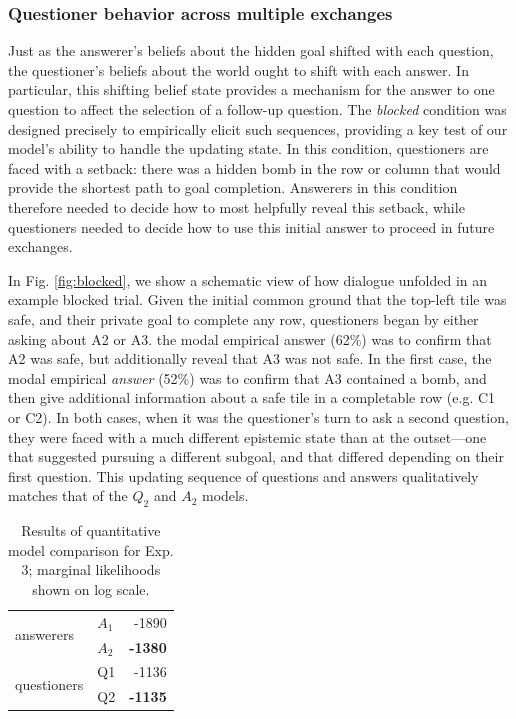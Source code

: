 \documentclass[11pt, floatsintext]{apa6}
\begin{document}
\subsubsection{Questioner behavior across multiple exchanges}

Just as the answerer's beliefs about the hidden goal shifted with each question, the questioner's beliefs about the world ought to shift with each answer. 
In particular, this shifting belief state provides a mechanism for the answer to one question to affect the selection of a follow-up question.
The \emph{blocked} condition was designed precisely to empirically elicit such sequences, providing a key test of our model's ability to handle the updating state.
In this condition, questioners are faced with a setback: there was a hidden bomb in the row or column that would provide the shortest path to goal completion.
Answerers in this condition therefore needed to decide how to most helpfully reveal this setback, while questioners needed to decide how to use this initial answer to proceed in future exchanges.

In Fig. \ref{fig:blocked}, we show a schematic view of how dialogue unfolded in an example blocked trial.
Given the initial common ground that the top-left tile was safe, and their private goal to complete any row, questioners began by either asking about A2 or A3.
the modal empirical answer (62\%) was to confirm that A2 was safe, but additionally reveal that A3 was not safe.
In the first case, the modal empirical \emph{answer} (52\%) was to confirm that A3 contained a bomb, and then give additional information about a safe tile in a completable row (e.g. C1 or C2).  
In both cases, when it was the questioner's turn to ask a second question, they were faced with a much different epistemic state than at the outset---one that suggested pursuing a different subgoal, and that differed depending on their first question. 
This updating sequence of questions and answers qualitatively matches that of the $Q_2$ and $A_2$ models.

\begin{table}[]
\begin{center}
\begin{tabular}{@{}llr@{}}
\toprule
\multirow{2}{*}{answerers} & $A_1$ & -1890 \\ \cmidrule(l){2-3} 
 & $A_2$ & \textbf{-1380} \\ \midrule
\multirow{2}{*}{questioners} & Q1 & -1136  \\ \cmidrule(l){2-3} 
 & Q2 & \textbf{-1135} \\ \bottomrule
\end{tabular}
\end{center}
\caption{Results of quantitative model comparison for Exp. 3; marginal likelihoods shown on log scale.}
\label{table:exp3likelihoods}
\end{table}
\end{document}
